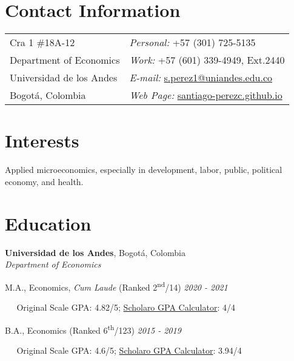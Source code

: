 \documentclass[margin,line]{res}
\newenvironment{list1}{
  \begin{list}{\ding{113}}{%
      \setlength{\itemsep}{0in}
      \setlength{\parsep}{0in} \setlength{\parskip}{0in}
      \setlength{\topsep}{0in} \setlength{\partopsep}{0in} 
      \setlength{\leftmargin}{0.17in}}}{\end{list}}
\begin{document}

\begin{resume}
\section{\sc Contact Information}
\vspace{.05in}
\begin{tabular}{@{}p{3in}p{3in}}
Cra 1 \#18A-12             & {\it Personal:} +57 (301) 725-5135 \\            
Department of Economics   & {\it Work:} +57 (601) 339-4949, Ext.2440  \\         
Universidad de los Andes & {\it E-mail:}  \href{mailto:s.perez1@uniandes.edu.co}{s.perez1@uniandes.edu.co}\\       
Bogotá, Colombia  & {\it Web Page:} \href{https://santiago-perezc.github.io}{santiago-perezc.github.io}  \\   
\end{tabular}


\section{\sc Interests}
Applied microeconomics, especially in development, labor, public, political economy, and health. 

\section{\sc Education}

{\bf Universidad de los Andes}, Bogotá, Colombia\\
{\em Department of Economics} \\
\begin{list1}

\item[]M.A., Economics, \textit{Cum Laude} (Ranked 2\textsuperscript{nd}/14) \hfill  {\it 2020  - 2021}
\item[]$\;\;\;\;\;$Original Scale GPA: 4.82/5; \href{https://santiago-perezc.github.io/documents/scholaro-masters.pdf}{Scholaro GPA Calculator}: 4/4 
\item[]
\item[] B.A., Economics (Ranked 6\textsuperscript{th}/123) \hfill {\it 2015 - 2019}
\item[]$\;\;\;\;\;$Original Scale GPA: 4.6/5; \href{https://santiago-perezc.github.io/documents/scholaro-undergrad.pdf}{Scholaro GPA Calculator}: 3.94/4 


\end{list1}
\end{resume}
\end{document}
